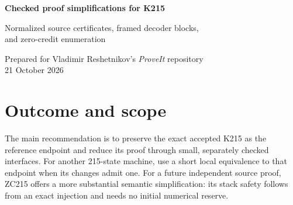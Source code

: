 \documentclass[11pt]{article}
\newcommand{\code}[1]{\texttt{\small #1}}
\begin{document}
\begin{center}
{\LARGE\bfseries Checked proof simplifications for K215}\par\vspace{8pt}
{\large Normalized source certificates, framed decoder blocks,\\
and zero-credit enumeration}\par\vspace{10pt}
Prepared for Vladimir Reshetnikov's \textit{ProveIt} repository\\
21 October 2026
\end{center}
\begin{abstract}
We reconcile the current K215 development with all seven additional archives in
\code{docs/incoming/} and implement three further proof components. First, the
incoming Lean normalization of a 2,240-entry source certificate is ported to
Rocq: a single checked 1,426-entry certificate proves the exact existing source
halting equivalence for every natural-valued register file. Second, an arbitrary-tape
finite-window theorem and its composition rule are proved in Lean, and applied
to 281 literal decoder blocks and the finite conditions of a 234-role decoder
product. Third, the concrete Cantor-code tag-lowering argument for ZC215 is
formalized in Coq, including the parser, strict decrease, injectivity and every
finite scheduling prefix. These extend the incoming work and retain its
attribution. We distinguish the smallest incremental machine proof, offered by
predecessor-marker variants, from a simpler standalone scheduler, offered by
ZC215. A coordinated two-merge/one-selector search tests 457,682,472 complete
provider specifications on 18 reference tables. It finds no verified 214-state
machine. Proof boundaries, source pins, reproduction commands and verification
logs accompany every result.
\end{abstract}

\section{Outcome and scope}

The main recommendation is to preserve the exact accepted K215 as the reference
endpoint and reduce its proof through small, separately checked interfaces.
For another 215-state machine, use a short local equivalence to that endpoint
when its changes admit one. For a future independent source proof, ZC215 offers
a more substantial semantic simplification: its stack safety follows from an
exact injection and needs no initial numerical reserve.
\end{document}

